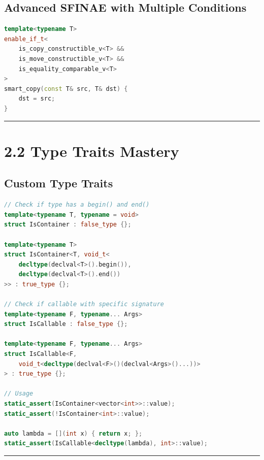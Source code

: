 \hypertarget{advanced-sfinae-with-multiple-conditions}{%
\subsection{Advanced SFINAE with Multiple
Conditions}\label{advanced-sfinae-with-multiple-conditions}}

\begin{lstlisting}[language={C++}]
template<typename T>
enable_if_t<
    is_copy_constructible_v<T> &&
    is_move_constructible_v<T> &&
    is_equality_comparable_v<T>
>
smart_copy(const T& src, T& dst) {
    dst = src;
}
\end{lstlisting}

\begin{center}\rule{0.5\linewidth}{0.5pt}\end{center}

\hypertarget{type-traits-mastery}{%
\section{2.2 Type Traits Mastery}\label{type-traits-mastery}}

\hypertarget{custom-type-traits}{%
\subsection{Custom Type Traits}\label{custom-type-traits}}

\begin{lstlisting}[language={C++}]
// Check if type has a begin() and end()
template<typename T, typename = void>
struct IsContainer : false_type {};

template<typename T>
struct IsContainer<T, void_t<
    decltype(declval<T>().begin()),
    decltype(declval<T>().end())
>> : true_type {};

// Check if callable with specific signature
template<typename F, typename... Args>
struct IsCallable : false_type {};

template<typename F, typename... Args>
struct IsCallable<F, 
    void_t<decltype(declval<F>()(declval<Args>()...))>
> : true_type {};

// Usage
static_assert(IsContainer<vector<int>>::value);
static_assert(!IsContainer<int>::value);

auto lambda = [](int x) { return x; };
static_assert(IsCallable<decltype(lambda), int>::value);
\end{lstlisting}

\begin{center}\rule{0.5\linewidth}{0.5pt}\end{center}

